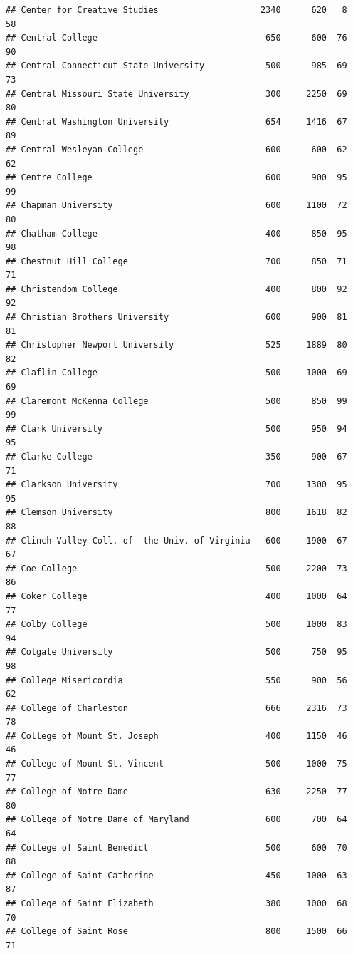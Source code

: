 \documentclass[
]{article}
\begin{document}
\begin{verbatim}
## Center for Creative Studies                    2340      620   8       58
## Central College                                 650      600  76       90
## Central Connecticut State University            500      985  69       73
## Central Missouri State University               300     2250  69       80
## Central Washington University                   654     1416  67       89
## Central Wesleyan College                        600      600  62       62
## Centre College                                  600      900  95       99
## Chapman University                              600     1100  72       80
## Chatham College                                 400      850  95       98
## Chestnut Hill College                           700      850  71       71
## Christendom College                             400      800  92       92
## Christian Brothers University                   600      900  81       81
## Christopher Newport University                  525     1889  80       82
## Claflin College                                 500     1000  69       69
## Claremont McKenna College                       500      850  99       99
## Clark University                                500      950  94       95
## Clarke College                                  350      900  67       71
## Clarkson University                             700     1300  95       95
## Clemson University                              800     1618  82       88
## Clinch Valley Coll. of  the Univ. of Virginia   600     1900  67       67
## Coe College                                     500     2200  73       86
## Coker College                                   400     1000  64       77
## Colby College                                   500     1000  83       94
## Colgate University                              500      750  95       98
## College Misericordia                            550      900  56       62
## College of Charleston                           666     2316  73       78
## College of Mount St. Joseph                     400     1150  46       46
## College of Mount St. Vincent                    500     1000  75       77
## College of Notre Dame                           630     2250  77       80
## College of Notre Dame of Maryland               600      700  64       64
## College of Saint Benedict                       500      600  70       88
## College of Saint Catherine                      450     1000  63       87
## College of Saint Elizabeth                      380     1000  68       70
## College of Saint Rose                           800     1500  66       71

\end{verbatim}
\end{document}
